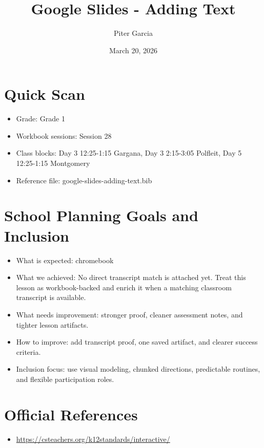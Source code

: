\documentclass[11pt]{article}
\title{Google Slides - Adding Text}
\author{Piter Garcia}
\date{March 20, 2026}
\begin{document}
\maketitle
\section*{Quick Scan}
\begin{itemize}[leftmargin=*]
\item Grade: Grade 1
\item Workbook sessions: Session 28
\item Class blocks: Day 3 12:25-1:15 Gargana, Day 3 2:15-3:05 Polfleit, Day 5 12:25-1:15 Montgomery
\item Reference file: google-slides-adding-text.bib
\end{itemize}
\section*{School Planning Goals and Inclusion}
\begin{itemize}[leftmargin=*]
\item What is expected: chromebook
\item What we achieved: No direct transcript match is attached yet. Treat this lesson as workbook-backed and enrich it when a matching classroom transcript is available.
\item What needs improvement: stronger proof, cleaner assessment notes, and tighter lesson artifacts.
\item How to improve: add transcript proof, one saved artifact, and clearer success criteria.
\item Inclusion focus: use visual modeling, chunked directions, predictable routines, and flexible participation roles.
\end{itemize}
\section*{Official References}
\begin{itemize}[leftmargin=*]
\item \url{https://csteachers.org/k12standards/interactive/}

\end{itemize}
\end{document}
